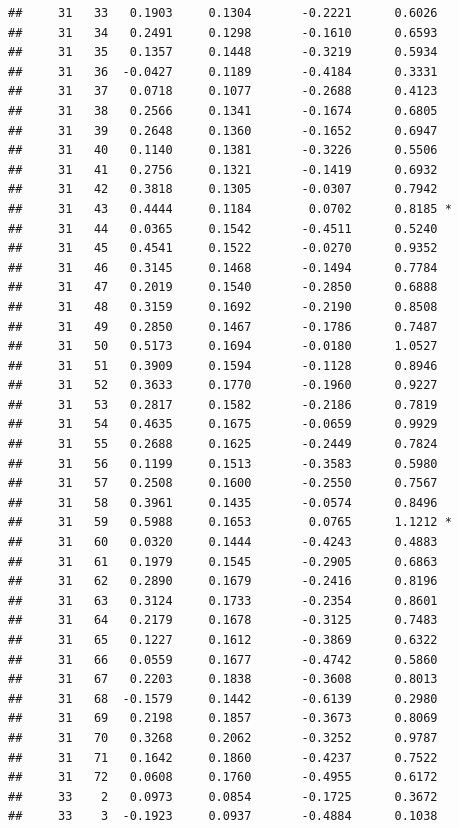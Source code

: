 \documentclass[
]{article}
\begin{document}
\begin{verbatim}
##     31   33   0.1903     0.1304       -0.2221      0.6026  
##     31   34   0.2491     0.1298       -0.1610      0.6593  
##     31   35   0.1357     0.1448       -0.3219      0.5934  
##     31   36  -0.0427     0.1189       -0.4184      0.3331  
##     31   37   0.0718     0.1077       -0.2688      0.4123  
##     31   38   0.2566     0.1341       -0.1674      0.6805  
##     31   39   0.2648     0.1360       -0.1652      0.6947  
##     31   40   0.1140     0.1381       -0.3226      0.5506  
##     31   41   0.2756     0.1321       -0.1419      0.6932  
##     31   42   0.3818     0.1305       -0.0307      0.7942  
##     31   43   0.4444     0.1184        0.0702      0.8185 *
##     31   44   0.0365     0.1542       -0.4511      0.5240  
##     31   45   0.4541     0.1522       -0.0270      0.9352  
##     31   46   0.3145     0.1468       -0.1494      0.7784  
##     31   47   0.2019     0.1540       -0.2850      0.6888  
##     31   48   0.3159     0.1692       -0.2190      0.8508  
##     31   49   0.2850     0.1467       -0.1786      0.7487  
##     31   50   0.5173     0.1694       -0.0180      1.0527  
##     31   51   0.3909     0.1594       -0.1128      0.8946  
##     31   52   0.3633     0.1770       -0.1960      0.9227  
##     31   53   0.2817     0.1582       -0.2186      0.7819  
##     31   54   0.4635     0.1675       -0.0659      0.9929  
##     31   55   0.2688     0.1625       -0.2449      0.7824  
##     31   56   0.1199     0.1513       -0.3583      0.5980  
##     31   57   0.2508     0.1600       -0.2550      0.7567  
##     31   58   0.3961     0.1435       -0.0574      0.8496  
##     31   59   0.5988     0.1653        0.0765      1.1212 *
##     31   60   0.0320     0.1444       -0.4243      0.4883  
##     31   61   0.1979     0.1545       -0.2905      0.6863  
##     31   62   0.2890     0.1679       -0.2416      0.8196  
##     31   63   0.3124     0.1733       -0.2354      0.8601  
##     31   64   0.2179     0.1678       -0.3125      0.7483  
##     31   65   0.1227     0.1612       -0.3869      0.6322  
##     31   66   0.0559     0.1677       -0.4742      0.5860  
##     31   67   0.2203     0.1838       -0.3608      0.8013  
##     31   68  -0.1579     0.1442       -0.6139      0.2980  
##     31   69   0.2198     0.1857       -0.3673      0.8069  
##     31   70   0.3268     0.2062       -0.3252      0.9787  
##     31   71   0.1642     0.1860       -0.4237      0.7522  
##     31   72   0.0608     0.1760       -0.4955      0.6172  
##     33    2   0.0973     0.0854       -0.1725      0.3672  
##     33    3  -0.1923     0.0937       -0.4884      0.1038  

\end{verbatim}
\end{document}
